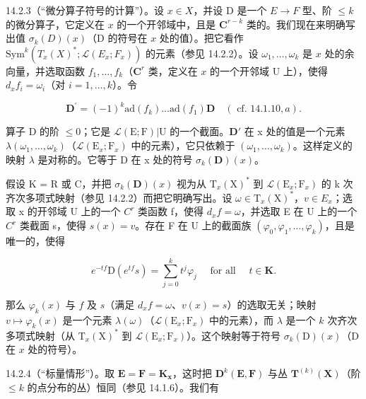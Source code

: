 14.2.3（“微分算子符号的计算”）。设 \(x \in X\)，并设 D 是一个 \(E \to F\) 型、阶 \(\leqslant k\) 的微分算子，它定义在 \(x\) 的一个开邻域中，且是 \(\mathbf{C}^{r-k}\) 类的。我们现在来明确写出值 \(\sigma_k(D)(x)\)（D 的符号在 \(x\) 处的值）。把它看作 \(\text{Sym}^k(T_x(X)^*; \mathcal{L}(E_x; F_x))\) 的元素（参见 14.2.2）。设 \(\omega_1, \ldots, \omega_k\) 是 \(x\) 处的余向量，并选取函数 \(f_1, \ldots, f_k\)（\(\mathbf{C}^r\) 类，定义在 \(x\) 的一个开邻域 U 上），使得 \(d_x f_i = \omega_i\)（对 \(i = 1, \ldots, k\)）。令

\[
\mathbf {D} ^ {\prime} = (- 1) ^ {k} \mathrm{ad} (f _ {k}) \dots \mathrm{ad} (f _ {1}) \mathbf {D} \quad (\text { cf. } 14.1.10, a).
\]

算子 D 的阶 \(\leqslant0\)；它是 \(\mathcal{L}(\mathrm{E};\mathrm{F})|\mathrm{U}\) 的一个截面。\(\mathbf{D}'\) 在 x 处的值是一个元素 \(\lambda(\omega_{1},\ldots,\omega_{k})\)（\(\mathcal{L}(\mathrm{E}_{x};\mathrm{F}_{x})\) 中的元素），它只依赖于 \((\omega_{1},\ldots,\omega_{k})\)。这样定义的映射 \(\lambda\) 是对称的。它等于 D 在 x 处的符号 \(\sigma_{k}(\mathbf{D})(x)\)。

假设 K = R 或 C，并把 \(\sigma_{k}(\mathbf{D})(x)\) 视为从 \(\mathrm{T}_{x}(\mathrm{X})^{*}\) 到 \(\mathcal{L}(\mathrm{E}_{x};\mathrm{F}_{x})\) 的 k 次齐次多项式映射（参见 14.2.2）而把它明确写出。设 \(\omega \in \mathrm{T}_{x}(\mathrm{X})^{*}\)，\(v \in E_{x}\)；选取 x 的开邻域 U 上的一个 \(C^{r}\) 类函数 f，使得 \(d_{x}f = \omega\)，并选取 E 在 U 上的一个 \(C^{r}\) 类截面 s，使得 \(s(x) = v\)。存在 F 在 U 上的截面族 \((\varphi_{0}, \varphi_{1}, \ldots, \varphi_{k})\)，且是唯一的，使得

\[
e ^ {- t f} \mathrm{D} (e ^ {t f} s) = \sum_ {j = 0} ^ {k} t ^ {j} \varphi_ {j} \quad \text { for all } \quad t \in \mathbf {K}.
\]

那么 \(\varphi_{k}(x)\) 与 \(f\) 及 \(s\)（满足 \(d_{x}f = \omega\)、\(v(x) = s\)）的选取无关；映射 \(v \mapsto \varphi_{k}(x)\) 是一个元素 \(\lambda(\omega)\)（\(\mathcal{L}(\mathrm{E}_{x}; \mathrm{F}_{x})\) 中的元素），而 \(\lambda\) 是一个 \(k\) 次齐次多项式映射（从 \(\mathrm{T}_{x}(\mathrm{X})^{*}\) 到 \(\mathcal{L}(\mathrm{E}_{x}; \mathrm{F}_{x})\)）。这个映射等于符号 \(\sigma_{k}(\mathrm{D})(x)\)（D 在 \(x\) 处的符号）。

14.2.4（“标量情形”）。取 \(\mathbf{E} = \mathbf{F} = \mathbf{K}_{\mathbf{x}}\)，这时把 \(\mathbf{D}^k(\mathbf{E}, \mathbf{F})\) 与丛 \(\mathbf{T}^{(k)}(\mathbf{X})\)（阶 \(\leqslant k\) 的点分布的丛）恒同（参见 14.1.6）。我们有

